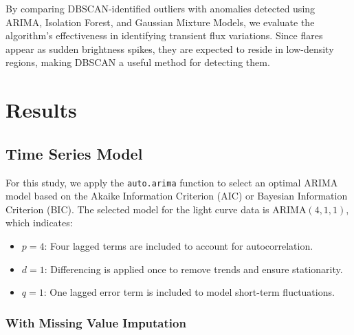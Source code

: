 \documentclass[
]{article}
\begin{document}
By comparing DBSCAN-identified outliers with anomalies detected using ARIMA, Isolation Forest, and Gaussian Mixture Models, we evaluate the algorithm's effectiveness in identifying transient flux variations. Since flares appear as sudden brightness spikes, they are expected to reside in low-density regions, making DBSCAN a useful method for detecting them.

\section{Results}\label{results}

\subsection{Time Series Model}\label{time-series-model}

For this study, we apply the \texttt{auto.arima} function to select an optimal ARIMA model based on the Akaike Information Criterion (AIC) or Bayesian Information Criterion (BIC). The selected model for the light curve data is ARIMA\((4,1,1)\), which indicates:

\begin{itemize}
    \item $p = 4$: Four lagged terms are included to account for autocorrelation.
    \item $d = 1$: Differencing is applied once to remove trends and ensure stationarity.
    \item $q = 1$: One lagged error term is included to model short-term fluctuations.
\end{itemize}

\subsubsection{With Missing Value Imputation}\label{with-missing-value-imputation}
\end{document}
